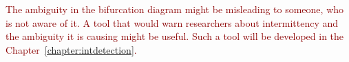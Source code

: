 \par
\textcolor{darkred}{
The ambiguity in the bifurcation diagram might be misleading to someone, who is not aware of it.
A tool that would warn researchers about intermittency and the ambiguity it is causing might be useful.
Such a tool will be developed in the Chapter~\ref{chapter:intdetection}.
}

\endinput
